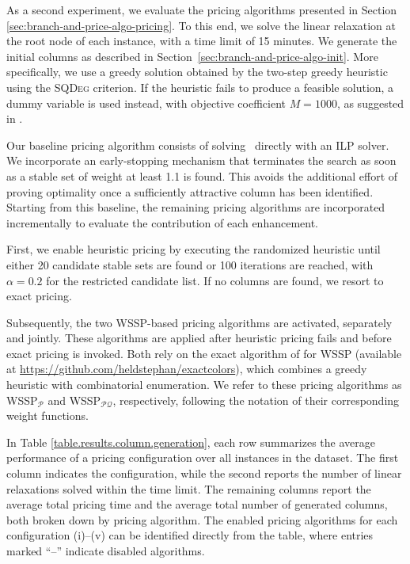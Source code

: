 \documentclass[preprint, 11pt, authoryear]{elsarticle}
\newcommand{\PP}{{\mathcal P}}
\newcommand{\QQ}{{\mathcal Q}}
\newcommand{\pricingform}{\text{DPCP-PRI}}
\begin{document}
As a second experiment, we evaluate the pricing algorithms presented in Section \ref{sec:branch-and-price-algo-pricing}. 
To this end, we solve the linear relaxation at the root node of each instance, with a time limit of 15 minutes.
We generate the initial columns as described in Section~\ref{sec:branch-and-price-algo-init}.
More specifically, we use a greedy solution obtained by the two-step greedy heuristic using the \textsc{SQDeg} criterion. 
If the heuristic fails to produce a feasible solution, a dummy variable is used instead, with objective coefficient $M=1000$, as suggested in \cite{Lucci2024}.

Our baseline pricing algorithm consists of solving \pricingform\ directly with an ILP solver.
We incorporate an early-stopping mechanism that terminates the search as soon as a stable set of weight at least 1.1 is found.
This avoids the additional effort of proving optimality once a sufficiently attractive column has been identified. 
Starting from this baseline, the remaining pricing algorithms are incorporated incrementally to evaluate the contribution of each enhancement.

First, we enable heuristic pricing by executing the randomized heuristic until either 20 candidate stable sets are found or 100 iterations are reached, with $\alpha=0.2$ for the restricted candidate list. 
If no columns are found, we resort to exact pricing.

Subsequently, the two WSSP-based pricing algorithms are activated, separately and jointly. These algorithms are applied after heuristic pricing fails and before exact pricing is invoked. 
Both rely on the exact algorithm of \cite{Held2012} for WSSP (available at \url{https://github.com/heldstephan/exactcolors}), which combines a greedy heuristic with combinatorial enumeration.
We refer to these pricing algorithms as WSSP$_{\PP}$ and WSSP$_{\PP\QQ}$, respectively, following the notation of their corresponding weight functions.

In Table \ref{table.results.column.generation}, each row summarizes the average performance of a pricing configuration over all instances in the dataset. 
The first column indicates the configuration, while the second reports the number of linear relaxations solved within the time limit. 
The remaining columns report the average total pricing time and the average total number of generated columns, both broken down by pricing algorithm.
The enabled pricing algorithms for each configuration (i)--(v) can be identified directly from the table, where entries marked ``--'' indicate disabled algorithms.
\end{document}
